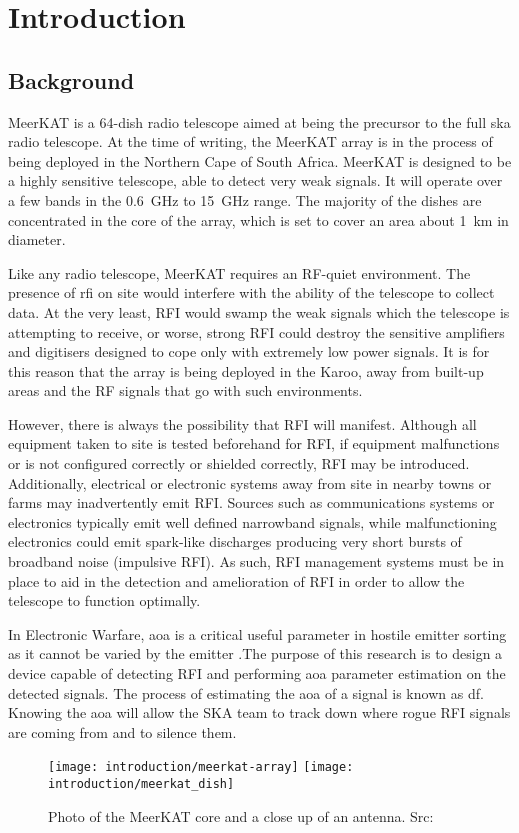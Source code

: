 \chapter{Introduction}
\label{ch:introduction}
\section{Background}
MeerKAT is a 64-dish radio telescope aimed at being the precursor to the full \gls{ska} radio telescope. At the time of writing, the MeerKAT array is in the process of being deployed in the Northern Cape of South Africa.
MeerKAT is designed to be a highly sensitive telescope, able to detect very weak signals. It will operate over a few bands in the \SI{0.6}{\giga\hertz} to \SI{15}{\giga\hertz} range. The majority of the dishes are concentrated in the core of the array, which is set to cover an area about \SI{1}{\kilo\meter} in diameter.

Like any radio telescope, MeerKAT requires an RF-quiet environment.
The presence of \gls{rfi} on site would interfere with the ability of the telescope to collect data. At the very least, RFI would swamp the weak signals which the telescope is attempting to receive, or  worse, strong RFI could destroy the sensitive amplifiers and digitisers designed to cope only with extremely low power signals.
It is for this reason that the array is being deployed in the Karoo, away from built-up areas and the RF signals that go with such environments.

However, there is always the possibility that RFI will manifest. 
Although all equipment taken to site is tested beforehand for RFI, if equipment malfunctions or is not configured correctly or shielded correctly, RFI may be introduced. Additionally, electrical or electronic systems away from site in nearby towns or farms may inadvertently emit RFI. 
Sources such as communications systems or electronics typically emit well defined narrowband signals, while malfunctioning electronics could emit spark-like discharges producing very short bursts of broadband noise (impulsive RFI).
As such, RFI management systems must be in place to aid in the detection and amelioration of RFI in order to allow the telescope to function optimally. 

In Electronic Warfare, \gls{aoa} is a critical useful parameter in hostile emitter sorting as it cannot be varied by the emitter \cite{center2012electronic}.The purpose of this research is to design a device capable of detecting RFI and performing \gls{aoa} parameter estimation on the detected signals.
The process of estimating the \gls{aoa} of a signal is known as \gls{df}.
Knowing the \gls{aoa} will allow the SKA team to track down where rogue RFI signals are coming from and to silence them.

\begin{figure}[hb]
  \centering
  \texttt{[image: introduction/meerkat-array]}
  \texttt{[image: introduction/meerkat\_dish]}
  \caption{Photo of the MeerKAT core and a close up of an antenna. Src: \cite{skasawebsite}}
\end{figure}



